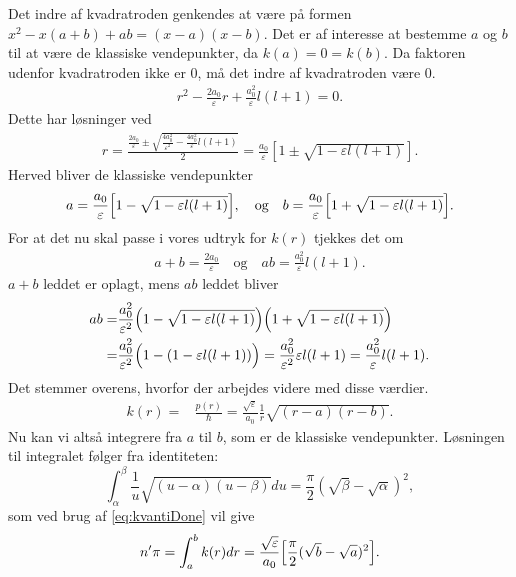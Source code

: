 Det indre af kvadratroden genkendes at være på formen $x^2 -x(a+b) + ab = (x-a)(x-b)$. Det er af interesse at bestemme $a$ og $b$ til at være de klassiske vendepunkter, da $k(a) = 0 = k(b)$. Da faktoren udenfor kvadratroden ikke er $0$, må det indre af kvadratroden være $0$.
%
\begin{align}
    r^2 - \frac{2a_0}{\varepsilon}r + \frac{a_0^2}{\varepsilon}l(l+1) = 0.
\end{align}
Dette har løsninger ved
\begin{align}
  r = \frac{\frac{2a_0}{\varepsilon} \pm \sqrt{\frac{4a_0^2}{\varepsilon^2} - \frac{4a_0^2}{\varepsilon}l(l+1)   }  }{2}
  = \frac{a_0}{\varepsilon}\left[1 \pm \sqrt{1-\varepsilon l(l+1)}\right].
\end{align}
Herved bliver de klassiske vendepunkter
\begin{align}
    a =  \frac{a_0}{\varepsilon}\Bigl[1-\sqrt{1-\varepsilon l(l+1)}  \Bigr],\quad \text{og} \quad b = \frac{a_0}{\varepsilon}\Bigl[1+\sqrt{1-\varepsilon l(l+1)}  \Bigr].
\end{align}
For at det nu skal passe i vores udtryk for $k(r)$ tjekkes det om
\begin{align}
    a+b = \frac{2a_0}{\varepsilon} \quad \text{og} \quad  ab  = \frac{a_0^2}{\varepsilon} l(l+1).
\end{align}
$a+b$ leddet er oplagt, mens $ab$ leddet bliver
\begin{align}
  ab = & \frac{a_0^2}{\varepsilon^2}\Bigl(1-\sqrt{1-\varepsilon l(l+1)} \Bigr)\Bigl(1+\sqrt{1-\varepsilon l(l+1)} \Bigr)\\
     = & \frac{a_0^2}{\varepsilon^2}\Bigl(1-(1-\varepsilon l(l+1)) \Bigr) =  \frac{a_0^2}{\varepsilon^2} \varepsilon l(l+1)
     = \frac{a_0^2}{\varepsilon} l(l+1).
\end{align}
%
Det stemmer overens, hvorfor der arbejdes videre med disse værdier.
\begin{align}
    k(r) = & \frac{p(r)}{\hbar} = \frac{\sqrt{\varepsilon}}{a_0}\frac{1}{r}\sqrt{(r-a)(r-b)}.
\end{align}
Nu kan vi altså integrere fra $a$ til $b$, som er de klassiske vendepunkter. Løsningen til integralet følger fra identiteten:
\begin{equation}
    \int_{\alpha}^{\beta}\frac{1}{u}\sqrt{(u-\alpha)(u-\beta)}du = \frac{\pi}{2}(\sqrt{\beta}-\sqrt{\alpha})^2,
\end{equation}
som ved brug af \cref{eq:kvantiDone} vil give
\begin{equation}
   n'\pi = \int_{a}^{b}k(r)dr = \frac{\sqrt{\varepsilon}}{a_0} \Bigl[\frac{\pi}{2}(\sqrt{b}-\sqrt{a})^2  \Bigr].
\end{equation}
